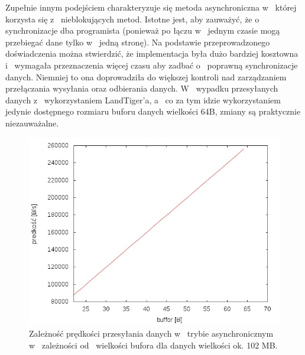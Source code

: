 \documentclass{BscUS}
\begin{document}
\newline
\indent Zupełnie innym podejściem charakteryzuje się metoda asynchroniczna w~ której korzysta się z~ nieblokujących metod. Istotne jest, aby zauważyć, że o~ synchronizacje dba programista (ponieważ po łączu w~ jednym czasie mogą przebiegać dane tylko w~ jedną stronę). Na podstawie przeprowadzonego doświadczenia można stwierdzić, że implementacja była dużo bardziej kosztowna i~ wymagała przeznaczenia więcej czasu aby zadbać o~ poprawną synchronizacje danych. Niemniej to ona doprowadziła do większej kontroli nad zarządzaniem przełączania wysyłania oraz odbierania danych. W~ wypadku przesyłanych danych z~ wykorzystaniem LandTiger'a, a~ co za tym idzie wykorzystaniem jedynie dostępnego rozmiaru buforu danych wielkości 64B, zmiany są praktycznie niezauważalne.
\begin{figure}[H]
{
\centering
\captionsetup{justification=centering}
\includegraphics[width=1\textwidth]{./img/A_107374200Receive}
\caption{Zależność prędkości przesyłania danych w~ trybie asynchronicznym w~ zależności od~ wielkości bufora dla danych wielkości ok. 102 MB.}
\label{fig:A_107374200Receive}
}

\end{figure}
\end{document}

